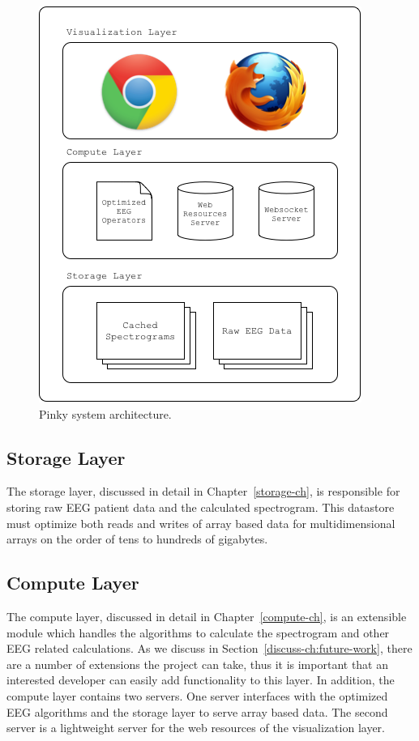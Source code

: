 \begin{figure}[h]
\begin{center}
\includegraphics[scale=0.75]{./img/system-architecture.png}
\caption{Pinky system architecture.}
\label{fig:system-architecture}
\end{center}
\end{figure}

\subsection{Storage Layer}

The storage layer, discussed in detail in Chapter~\ref{storage-ch}, is
responsible for storing raw EEG patient data and the calculated spectrogram.
This datastore must optimize both reads and writes of array based data for
multidimensional arrays on the order of tens to hundreds of gigabytes.

\subsection{Compute Layer}

The compute layer, discussed in detail in Chapter~\ref{compute-ch}, is an
extensible module which handles the algorithms to calculate the spectrogram and
other EEG related calculations. As we discuss in
Section~\ref{discuss-ch:future-work}, there are a number of extensions the
project can take, thus it is important that an interested developer can easily
add functionality to this layer. In addition, the compute layer contains two
servers. One server interfaces with the optimized EEG algorithms and the
storage layer to serve array based data. The second server is a lightweight
server for the web resources of the visualization layer.


